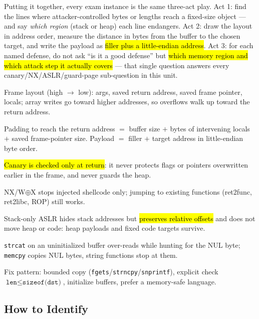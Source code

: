 \documentclass[12pt, a4paper]{article}
\newcommand{\imp}[1]{\hl{#1}}                       %
\begin{document}
Putting it together, every exam instance is the same three-act play. Act 1: find the lines where attacker-controlled bytes or lengths reach a fixed-size object --- and say \emph{which region} (stack or heap) each line endangers.
Act 2: draw the layout in address order, measure the distance in bytes from the buffer to the chosen target, and write the payload as \imp{filler plus a little-endian address}.
Act 3: for each named defense, do not ask ``is it a good defense'' but \imp{which memory region and which attack step it actually covers} --- that single question answers every canary/NX/ASLR/guard-page sub-question in this unit.

\begin{theorybox}
\begin{tightitem}
    \item Frame layout (high $\rightarrow$ low): args, saved return address, saved frame pointer, locals; array writes go toward higher addresses, so overflows walk up toward the return address.
    \item Padding to reach the return address $=$ buffer size $+$ bytes of intervening locals $+$ saved frame-pointer size. Payload $=$ filler $+$ target address in little-endian byte order.
    \item \imp{Canary is checked only at return}: it never protects flags or pointers overwritten earlier in the frame, and never guards the heap.
    \item NX/W$\oplus$X stops injected shellcode only; jumping to existing functions (ret2func, ret2libc, ROP) still works.
    \item Stack-only ASLR hides stack addresses but \imp{preserves relative offsets} and does not move heap or code: heap payloads and fixed code targets survive.
    \item \texttt{strcat} on an uninitialized buffer over-reads while hunting for the NUL byte; \texttt{memcpy} copies NUL bytes, string functions stop at them.
    \item Fix pattern: bounded copy (\texttt{fgets}/\texttt{strncpy}/\texttt{snprintf}), explicit check $\texttt{len} \leq \texttt{sizeof(dst)}$, initialize buffers, prefer a memory-safe language.
\end{tightitem}
\end{theorybox}

\subsection*{How to Identify}
\end{document}
